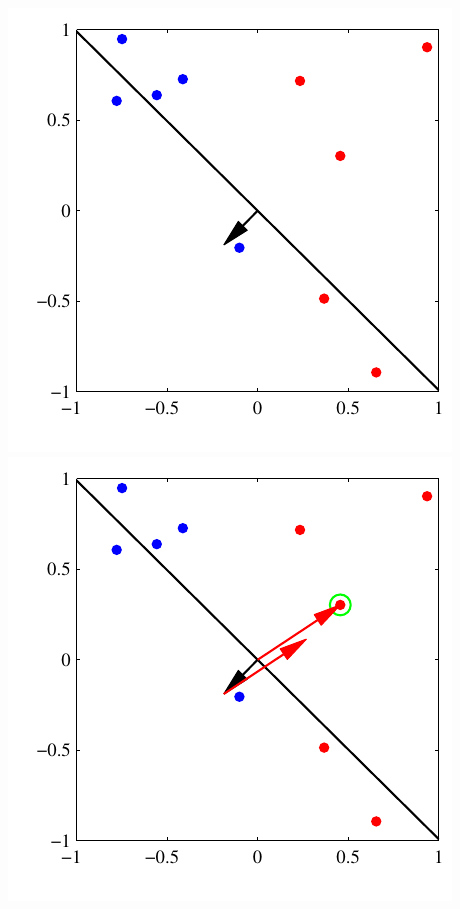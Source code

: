 \documentclass[ignorenonframetext,plain,fleqn]{beamer}
\begin{document}
\begin{frame}
\begin{columns}
\includegraphics[height=.4\textheight]{images/bishop-fig-4-7b.pdf}\\ \includegraphics[height=.4\textheight]{images/bishop-fig-4-7c.pdf}

\end{columns}
\end{frame}
\end{document}
